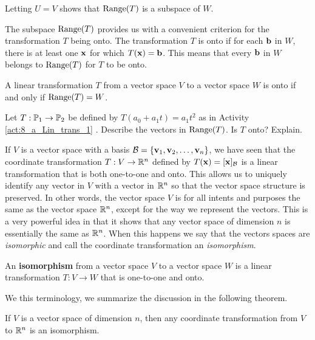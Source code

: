 Letting $U = V$ shows that $\text{Range}(T)$ is a subspace of $W$. 

The subspace $\text{Range}(T)$ provides us with a convenient criterion for the transformation $T$ being onto. The transformation $T$ is onto if for each $\mathbf{b}$ in $W$, there is at least one $\mathbf{x}$ for which $T(\mathbf{x})=\mathbf{b}$. This means that every $\mathbf{b}$ in $W$ belongs to $\text{Range}(T)$ for $T$ to be onto. 

\begin{theorem} \label{thm:8_a_onto_range} A linear transformation $T$ from a vector space $V$ to a vector space $W$ is onto if and only if $\text{Range}(T) = W$.
\end{theorem}

\begin{activity}  Let $T: \mathbb{P}_1 \to \mathbb{P}_2$ be defined by $T(a_0+a_1t) = a_1t^2$ as in Activity \ref{act:8_a_Lin_trans_1} . Describe the vectors in $\text{Range}(T)$. Is $T$ onto? Explain.

\end{activity}

\label{sec:isomorph}

If $V$ is a vector space with a basis $\mathcal{B} = \{\mathbf{v}_1, \mathbf{v}_2, \ldots, \mathbf{v}_n\}$, we have seen that the coordinate transformation $T : V \to \mathbb{R}^n$ defined by $T(\mathbf{x}) = [\mathbf{x}]_{\mathcal{B}}$ is a linear transformation that is both one-to-one and onto. This allows us to uniquely identify any vector in $V$ with a vector in $\mathbb{R}^n$ so that the vector space structure is preserved. In other words, the vector space $V$ is for all intents and purposes the same as the vector space $\mathbb{R}^n$, except for the way we represent the vectors. This is a very powerful idea in that it shows that any vector space of dimension $n$ is essentially the same as $\mathbb{R}^n$. 
 When this happens we say that the vectors spaces are \emph{isomorphic} and call the coordinate transformation an \emph{isomorphism}.

\begin{definition}  An \textbf{isomorphism} from a vector space $V$ to a vector space $W$ is a linear transformation $T : V \to W$ that is one-to-one and onto. 
\end{definition}

We this terminology, we summarize the discussion in the following theorem.

\begin{theorem} If $V$ is a vector space of dimension $n$, then any coordinate transformation from $V$ to $\mathbb{R}^n$ is an isomorphism.
\end{theorem}

